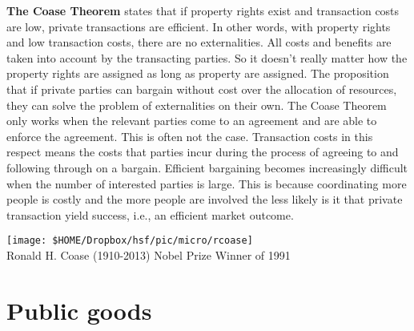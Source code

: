 \begin{minipage}{0.7\textwidth}
	\textbf{The Coase Theorem }states that if property rights exist and transaction costs are low, private transactions are efficient. In other words, with property rights and low transaction costs, there are no externalities. All costs and benefits are taken into account by the transacting parties. So it doesn't really matter how the property rights are assigned as long as property are assigned.
	The proposition that if private parties can bargain without cost over the allocation of resources, they can solve the problem of externalities on their own.
	The Coase Theorem only works when the relevant parties come to an agreement and are able to enforce the agreement. This is often not the case.
	Transaction costs in this respect means the costs that parties incur during the process of agreeing to and following through on a bargain.
	Efficient bargaining becomes increasingly difficult when the number of interested parties is large. This is because coordinating more people is costly and the more people are involved the less likely is it that private transaction yield success, i.e., an efficient market outcome.
\end{minipage}
\begin{minipage}{0.3\textwidth}
	\begin{center}
		\texttt{[image: \$HOME/Dropbox/hsf/pic/micro/rcoase]}\\
		Ronald H. Coase (1910-2013) Nobel Prize Winner of 1991
	\end{center}
\end{minipage}


\section{Public goods}\label{sec:publicgoods}

